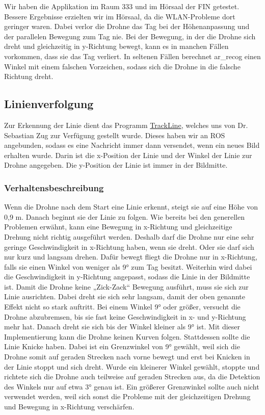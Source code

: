 Wir haben die Applikation im Raum 333 und im Hörsaal der FIN getestet. Bessere Ergebnisse erzielten wir im Hörsaal, da die WLAN-\/Probleme dort geringer waren. Dabei verlor die Drohne das Tag bei der Höhenanpassung und der parallelen Bewegung zum Tag nie. Bei der Bewegung, in der die Drohne sich dreht und gleichzeitig in y-\/Richtung bewegt, kann es in manchen Fällen vorkommen, dass sie das Tag verliert. In seltenen Fällen berechnet ar\_\-recog einen Winkel mit einem falschen Vorzeichen, sodass sich die Drohne in die falsche Richtung dreht.

\subsection*{Linienverfolgung }

Zur Erkennung der Linie dient das Programm \hyperlink{namespace_track_line}{TrackLine}, welches uns von Dr. Sebastian Zug zur Verfügung gestellt wurde. Dieses haben wir an ROS angebunden, sodass es eine Nachricht immer dann versendet, wenn ein neues Bild erhalten wurde. Darin ist die x-\/Position der Linie und der Winkel der Linie zur Drohne angegeben. Die y-\/Position der Linie ist immer in der Bildmitte.

\subsubsection*{Verhaltensbeschreibung }

Wenn die Drohne nach dem Start eine Linie erkennt, steigt sie auf eine Höhe von 0,9 m. Danach beginnt sie der Linie zu folgen. Wie bereits bei den generellen Problemen erwähnt, kann eine Bewegung in x-\/Richtung und gleichzeitige Drehung nicht richtig ausgeführt werden. Deshalb darf die Drohne nur eine sehr geringe Geschwindigkeit in x-\/Richtung haben, wenn sie dreht. Oder sie darf sich nur kurz und langsam drehen. Dafür bewegt fliegt die Drohne nur in x-\/Richtung, falls sie einen Winkel von weniger als 9° zum Tag besitzt. Weiterhin wird dabei die Geschwindigkeit in y-\/Richtung angepasst, sodass die Linie in der Bildmitte ist. Damit die Drohne keine „Zick-\/Zack“ Bewegung ausführt, muss sie sich zur Linie ausrichten. Dabei dreht sie sich sehr langsam, damit der oben genannte Effekt nicht so stark auftritt. Bei einem Winkel 9° oder größer, versucht die Drohne abzubremsen, bis sie fast keine Geschwindigkeit in x-\/ und y-\/Richtung mehr hat. Danach dreht sie sich bis der Winkel kleiner als 9° ist. Mit dieser Implementierung kann die Drohne keinen Kurven folgen. Stattdessen sollte die Linie Knicke haben. Dabei ist ein Grenzwinkel von 9° gewählt, weil sich die Drohne somit auf geraden Strecken nach vorne bewegt und erst bei Knicken in der Linie stoppt und sich dreht. Wurde ein kleinerer Winkel gewählt, stoppte und richtete sich die Drohne auch teilweise auf geraden Strecken aus, da die Detektion des Winkels nur auf etwa 3° genau ist. Ein größerer Grenzwinkel sollte auch nicht verwendet werden, weil sich sonst die Probleme mit der gleichzeitigen Drehung und Bewegung in x-\/Richtung verschärfen.

